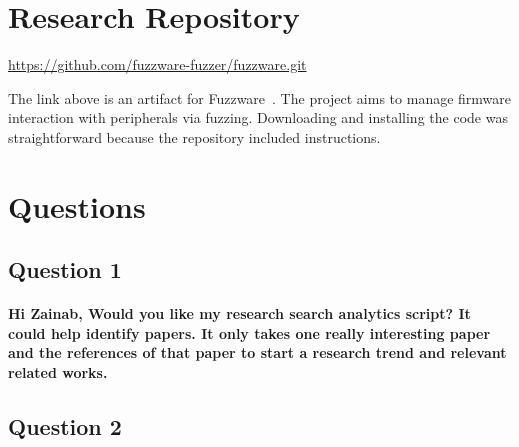 \section{Research Repository}  \label{sec-research-repository}

\url{https://github.com/fuzzware-fuzzer/fuzzware.git}

The link above is an artifact for  Fuzzware~\cite{scharnowski2022fuzzware}. The project aims to manage firmware interaction with peripherals via fuzzing. Downloading and installing the code was straightforward because the repository included instructions.






\section{Questions}
\subsection{Question 1}
\paragraph{Hi Zainab, Would you like my research search analytics script? It could help identify papers. It only takes one really interesting paper and the references of that paper to start a research trend and relevant related works.}
\subsection{Question 2}
\paragraph{}

%
